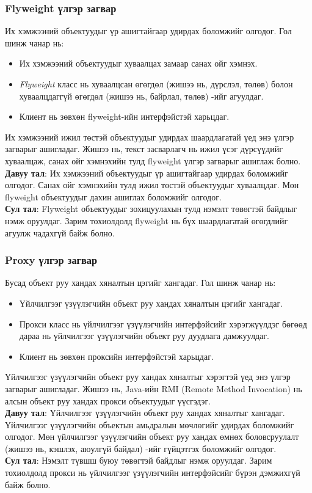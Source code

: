 \subsubsection{Flyweight үлгэр загвар}
\quad \quad Их хэмжээний объектуудыг үр ашигтайгаар удирдах боломжийг олгодог. Гол шинж чанар нь:
\begin{itemize}
	\item Их хэмжээний объектуудыг хуваалцах замаар санах ойг хэмнэх.
	\item \textit{Flyweight} класс нь хуваалцсан өгөгдөл (жишээ нь, дүрслэл, төлөв) болон хуваалцдаггүй өгөгдөл (жишээ нь, байрлал, төлөв) -ийг агуулдаг.
	\item Клиент нь зөвхөн flyweight-ийн интерфэйстэй харьцдаг.
\end{itemize}
Их хэмжээний ижил төстэй объектуудыг удирдах шаардлагатай үед энэ үлгэр загварыг ашигладаг. Жишээ нь, текст засварлагч нь ижил үсэг дүрсүүдийг хуваалцаж, санах ойг хэмнэхийн тулд flyweight үлгэр загварыг ашиглаж болно.\\
\textbf{Давуу тал}: Их хэмжээний объектуудыг үр ашигтайгаар удирдах боломжийг олгодог. Санах ойг хэмнэхийн тулд ижил төстэй объектуудыг хуваалцдаг. Мөн flyweight объектуудыг дахин ашиглах боломжийг олгодог.\\
\textbf{Сул тал}: Flyweight объектуудыг зохицуулахын тулд нэмэлт төвөгтэй байдлыг нэмж оруулдаг. Зарим тохиолдолд flyweight нь бүх шаардлагатай өгөгдлийг агуулж чадахгүй байж болно.	

\subsubsection{Proxy үлгэр загвар}
\quad \quad Бусад объект руу хандах хяналтын цэгийг хангадаг. Гол шинж чанар нь:
\begin{itemize}
	\item Үйлчилгээг үзүүлэгчийн объект руу хандах хяналтын цэгийг хангадаг.
	\item Прокси класс нь үйлчилгээг үзүүлэгчийн интерфэйсийг хэрэгжүүлдэг бөгөөд дараа нь үйлчилгээг үзүүлэгчийн объект руу дуудлага дамжуулдаг.
	\item Клиент нь зөвхөн проксийн интерфэйстэй харьцдаг.
\end{itemize}
Үйлчилгээг үзүүлэгчийн объект руу хандах хяналтыг хэрэгтэй үед энэ үлгэр загварыг ашигладаг. Жишээ нь, Java-ийн RMI (Remote Method Invocation) нь алсын объект руу хандах прокси объектуудыг үүсгэдэг.\\
\textbf{Давуу тал}: Үйлчилгээг үзүүлэгчийн объект руу хандах хяналтыг хангадаг. Үйлчилгээг үзүүлэгчийн объектын амьдралын мөчлөгийг удирдах боломжийг олгодог. Мөн үйлчилгээг үзүүлэгчийн объект руу хандах өмнөх боловсруулалт (жишээ нь, кэшлэх, аюулгүй байдал) -ийг гүйцэтгэх боломжийг олгодог.\\
\textbf{Сул тал}: Нэмэлт түвшш буюу төвөгтэй байдлыг нэмж оруулдаг. Зарим тохиолдолд прокси нь үйлчилгээг үзүүлэгчийн интерфэйсийг бүрэн дэмжихгүй байж болно.		

